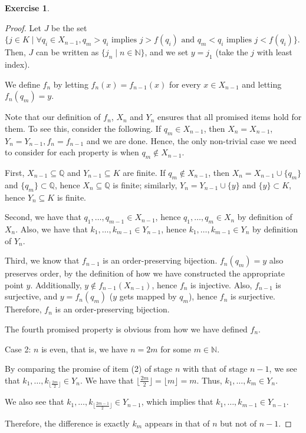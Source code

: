 \documentclass[11pt]{article}
\newcommand{\bbN}{\mathbb{N}}
\newcommand{\bbQ}{\mathbb{Q}}
\theoremstyle{definition}
\newtheorem{exercise}[theorem]{Exercise}
\numberwithin{equation}{subsection}
\begin{document}
\begin{exercise}
\begin{proof}
Let $J$ be the set $\{j \in K \mid \forall q_i \in X_{n-1}, q_m>q_i \text{ implies } j >f(q_i) \text{ and } q_m<q_i \text{ implies } j<f(q_i)\}$. Then, $J$ can be written as $\{j_n \mid n \in \bbN\}$, and we set $y = j_1$ (take the $j$ with least index). 

We define $f_n$ by letting $f_n(x) = f_{n-1}(x)$ for every $x\in X_{n-1}$ and letting $f_n(q_m) = y$.

Note that our definition of $f_n$, $X_n$ and $Y_n$ ensures that all promised items hold for them. To see this, consider the following. If $q_m \in X_{n-1}$, then $X_n = X_{n-1}$, $Y_n = Y_{n-1}, f_n=f_{n-1}$ and we are done. Hence, the only non-trivial case we need to consider for each property is when $q_m \notin X_{n-1}$.

First, $X_{n-1} \subseteq \bbQ$ and $Y_{n-1} \subseteq K$ are finite. If $q_m \notin X_{n-1}$, then $X_n = X_{n-1}\cup\{q_m\}$ and $\{q_m\} \subset \bbQ$, hence $X_n \subseteq \bbQ$ is finite; similarly, $Y_n = Y_{n-1}\cup\{y\}$ and $\{y\} \subset K$, hence $Y_n \subseteq K$ is finite. 

Second, we have that $q_1,\dots,q_{m-1} \in X_{n-1}$, hence $q_1,\dots,q_{m} \in X_{n}$ by definition of $X_n$. Also, we have that $k_1,\dots,k_{m-1} \in Y_{n-1}$, hence $k_1,\dots,k_{m-1} \in Y_{n}$ by definition of $Y_n$.

Third, we know that $f_{n-1}$ is an order-preserving bijection. $f_n(q_m)=y$ also preserves order, by the definition of how we have constructed the appropriate point $y$. Additionally, $y \notin f_{n-1}(X_{n-1})$, hence $f_n$ is injective. Also, $f_{n-1}$ is surjective, and $y=f_n(q_m)$ ($y$ gets mapped by $q_m$), hence $f_n$ is surjective. Therefore, $f_n$ is an order-preserving bijection.

The fourth promised property is obvious from how we have defined $f_n$. 

Case 2: $n$ is even, that is, we have $n = 2m$ for some $m\in\mathbb{N}$. 

By comparing the promise of item (2) of stage $n$ with that of stage $n-1$, we see that $k_1,\dots,k_{\lfloor \frac{2m}{2} \rfloor} \in Y_n$. We have that $\lfloor \frac{2m}{2} \rfloor = \lfloor m \rfloor = m$. Thus, $k_1,\dots,k_m \in Y_n$.

We also see that $k_1,\dots,k_{\lfloor \frac{2m-1}{2} \rfloor} \in Y_{n-1}$, which implies that $k_1,\dots,k_{m-1} \in Y_{n-1}$. 

Therefore, the difference is exactly $k_m$ appears in that of $n$ but not of $n-1$. 


\end{proof}
\end{exercise}
\end{document}
